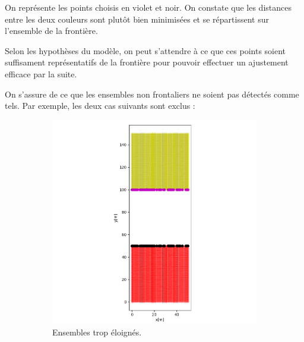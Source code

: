 \documentclass[12pt]{article}
\begin{document}
    On représente les points choisis en violet et noir. On constate que les distances entre les deux couleurs sont plutôt bien minimisées et se répartissent sur l'ensemble de la frontière.
    
    Selon les hypothèses du modèle, on peut s'attendre à ce que ces points soient suffisament représentatifs de la frontière pour pouvoir effectuer un ajustement efficace par la suite.

    On s'assure de ce que les ensembles non frontaliers ne soient pas détectés comme tels. Par exemple, les deux cas suivants sont exclus :

    \begin{figure}[ht!]
        \centering
        \begin{subfigure}[b]{0.475\textwidth}
            \centering
            \includegraphics[width=\textwidth]{Images/Frontiere_pts_carre1-5.png}
            \caption[]%
            {{ \small Ensembles trop éloignés.}}    
        \end{subfigure}
        \hfill
        \begin{subfigure}[b]{0.475\textwidth}  
            \centering 

\end{subfigure}
\end{figure}
\end{document}

